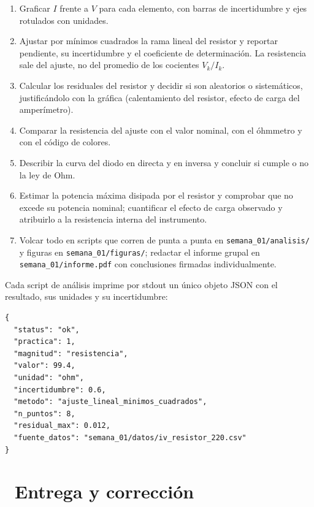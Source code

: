 \documentclass[11pt,a4paper]{article}
\newcommand{\iconotexto}[2]{\textcolor{cyanNeon}{\faIcon{#1}}~#2}
\begin{document}
\begin{enumerate}[leftmargin=1.6em,itemsep=2pt,topsep=3pt]
  \item Graficar $I$ frente a $V$ para cada elemento, con barras de incertidumbre y ejes rotulados con unidades.
  \item Ajustar por mínimos cuadrados la rama lineal del resistor y reportar pendiente, su incertidumbre y el coeficiente de determinación. La resistencia sale del ajuste, no del promedio de los cocientes $V_k/I_k$.
  \item Calcular los residuales del resistor y decidir si son aleatorios o sistemáticos, justificándolo con la gráfica (calentamiento del resistor, efecto de carga del amperímetro).
  \item Comparar la resistencia del ajuste con el valor nominal, con el óhmmetro y con el código de colores.
  \item Describir la curva del diodo en directa y en inversa y concluir si cumple o no la ley de Ohm.
  \item Estimar la potencia máxima disipada por el resistor y comprobar que no excede su potencia nominal; cuantificar el efecto de carga observado y atribuirlo a la resistencia interna del instrumento.
  \item Volcar todo en scripts que corren de punta a punta en \texttt{semana\_01/analisis/} y figuras en \texttt{semana\_01/figuras/}; redactar el informe grupal en \texttt{semana\_01/informe.pdf} con conclusiones firmadas individualmente.
\end{enumerate}

Cada script de análisis imprime por stdout un único objeto JSON con el resultado, sus unidades y su incertidumbre:

\begin{lstlisting}
{
  "status": "ok",
  "practica": 1,
  "magnitud": "resistencia",
  "valor": 99.4,
  "unidad": "ohm",
  "incertidumbre": 0.6,
  "metodo": "ajuste_lineal_minimos_cuadrados",
  "n_puntos": 8,
  "residual_max": 0.012,
  "fuente_datos": "semana_01/datos/iv_resistor_220.csv"
}
\end{lstlisting}

\section{\iconotexto{upload}{Entrega y corrección}}
\end{document}
